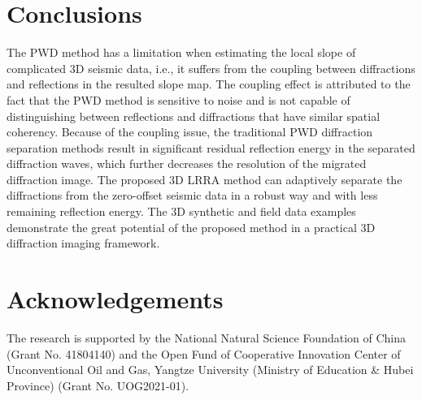 

%

\section{Conclusions}
The PWD method has a limitation when estimating the local slope of complicated 3D seismic data, i.e., it suffers from the coupling between diffractions and reflections in the resulted slope map. The coupling effect is attributed to the fact that the PWD method is sensitive to noise and is not capable of distinguishing between reflections and diffractions that have similar spatial coherency. Because of the coupling issue, the traditional PWD diffraction separation methods result in significant residual reflection energy in the separated diffraction waves, which further decreases the resolution of the migrated diffraction image. The proposed 3D LRRA method can adaptively separate the diffractions from the zero-offset seismic data in a robust way and with less remaining reflection energy. The 3D synthetic and field data examples demonstrate the great potential of the proposed method in a practical 3D diffraction imaging framework.


\section{Acknowledgements}
The research is supported by the National Natural Science Foundation of China (Grant No. 41804140) and the Open Fund of Cooperative Innovation Center of Unconventional Oil and Gas, Yangtze University (Ministry of Education \& Hubei Province) (Grant No. UOG2021-01).






%




